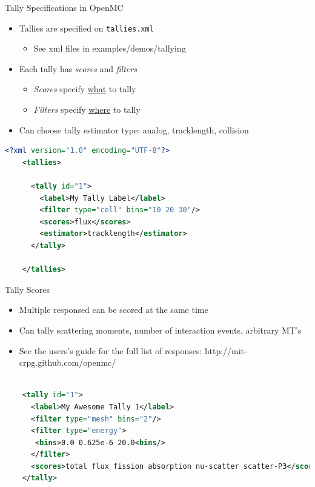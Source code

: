 \documentclass[serif]{beamer}
\begin{document}
\begin{frame}[fragile]{Tally Specifications in OpenMC}

  \begin{itemize}
    \item Tallies are specified on \verb|tallies.xml|
    \begin{itemize}
      \item See xml files in examples/demos/tallying
    \end{itemize}
    \item Each tally has \textit{scores} and \textit{filters}
    \begin{itemize}
      \item \textit{Scores} specify \underline{what} to tally
      \item \textit{Filters} specify \underline{where} to tally
    \end{itemize}
    \item Can choose tally estimator type: analog, tracklength, collision
  \end{itemize}

  \begin{scriptsize}
    \begin{lstlisting}[language=XML,gobble=4]
    <?xml version="1.0" encoding="UTF-8"?>
    <tallies>

      <tally id="1">
        <label>My Tally Label</label>
        <filter type="cell" bins="10 20 30"/>
        <scores>flux</scores>
        <estimator>tracklength</estimator>
      </tally>
      
    </tallies>
    \end{lstlisting}
  \end{scriptsize}

\end{frame}


\begin{frame}[fragile]{Tally Scores}

  \begin{itemize}
    \item Multiple responsed can be scored at the same time
    \item Can tally scattering moments, number of interaction events, arbitrary MT's
    \item See the users's guide for the full list of responses: http://mit-crpg.github.com/openmc/
  \end{itemize}

  \begin{scriptsize}
    \begin{lstlisting}[language=XML,gobble=4]

    <tally id="1">
      <label>My Awesome Tally 1</label>
      <filter type="mesh" bins="2"/>
      <filter type="energy">
       <bins>0.0 0.625e-6 20.0<bins/>
      </filter> 
      <scores>total flux fission absorption nu-scatter scatter-P3</scores>
    </tally>

    \end{lstlisting}
  \end{scriptsize}

\end{frame}
\end{document}
